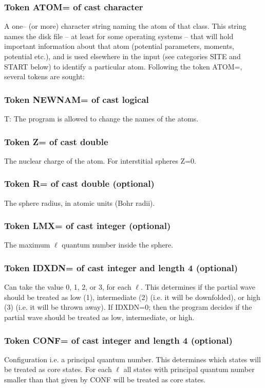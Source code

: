 \documentclass[aps,twocolumn,a4]{revtex4}
\begin{document}
\subsubsection{Token ATOM= of cast character}
A one-- (or more) character string naming the atom of
that class.  This string names the disk file -- at least for some
operating systems -- that will hold important information about that
atom (potential parameters, moments, potential etc.),
and is used elsewhere in the input (see categories SITE
and START below) to identify a particular atom.  Following the token
ATOM=, several tokens are sought:

\subsubsection{Token NEWNAM= of cast logical}
T: The program is allowed to change the names of the atoms.

\subsubsection{Token Z= of cast double}
The nuclear charge of the atom. For interstitial spheres Z=0.

\subsubsection{Token R= of cast double (optional)}
The sphere radius, in atomic units (Bohr radii).

\subsubsection{Token LMX= of cast integer (optional)}
The maximum $\ell $ quantum number inside the sphere.

\subsubsection{Token IDXDN= of cast integer and length 4 (optional)}
Can take the value 0, 1, 2, or 3, for each $\ell $. This
determines if the partial wave should be treated as low (1),
intermediate (2) (i.e. it will be downfolded), or high (3) (i.e. it will
be thrown away). If IDXDN=0;
then the program decides if the partial wave should
be treated as low, intermediate, or high.

\subsubsection{Token CONF= of cast integer and length 4 (optional)}
Configuration i.e. a principal quantum number.
This determines which states will be treated
as core states.  For each $\ell $ all states with principal quantum
number smaller than that given by CONF will be treated as core states.
\end{document}
